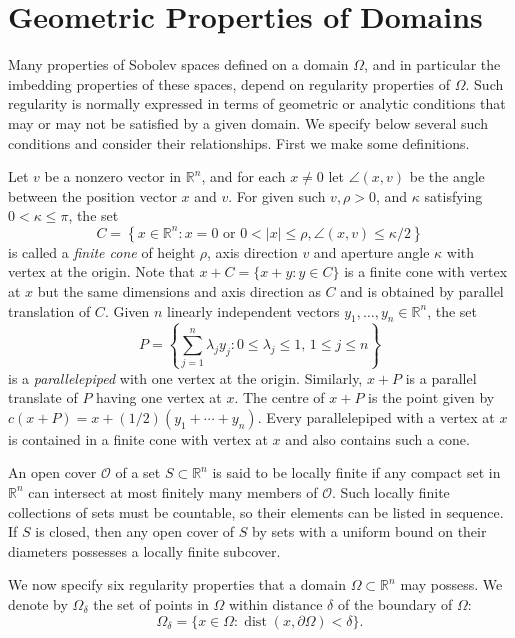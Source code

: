 \section{Geometric Properties of Domains}

\begin{para}
  Many properties of Sobolev spaces defined on a domain $\Omega$, and in particular the imbedding 
  properties of these spaces, depend on regularity properties of $\Omega$. Such regularity is 
  normally expressed in terms of geometric or analytic conditions that may or may not be satisfied 
  by a given domain. We specify below several such conditions and consider their relationships. 
  First we make some definitions.
  
  Let $v$ be a nonzero vector in $\mathbb{R}^n$, and for each $x \neq 0$ let $\angle(x, v)$ be the 
  angle between the position vector $x$ and $v$. For given such $v, \rho>0$, and $\kappa$ 
  satisfying $0<\kappa \leq \pi$, the set
  \[
    C = \left\{x \in \mathbb{R}^n: x=0 \text { or } 0<|x| \leq \rho, \angle(x, v) \leq \kappa / 2\right\}
  \]
  is called a \emph{finite cone} of height $\rho$, axis direction $v$ and aperture angle $\kappa$ 
  with vertex at the origin. Note that $x+C=\{x+y: y \in C\}$ is a finite cone with vertex at $x$ 
  but the same dimensions and axis direction as $C$ and is obtained by parallel translation of $C$.
  Given $n$ linearly independent vectors $y_1, \ldots, y_n \in \mathbb{R}^n$, the set
  \[
    P = \left\{\sum_{j=1}^n \lambda_j y_j: 0 \leq \lambda_j \leq 1,\, 1 \leq j \leq n\right\}
  \]
  is a \emph{parallelepiped} with one vertex at the origin.
  Similarly, $x+P$ is a parallel translate of $P$ having one vertex at $x$.
  The centre of $x+P$ is the point given by
  $c(x+P)=x+(1 / 2)\left(y_1+\cdots+y_n\right)$. Every parallelepiped with a vertex at $x$ is 
  contained in a finite cone with vertex at $x$ and also contains such a cone.
  
  An open cover $\mathscr{O}$ of a set $S \subset \mathbb{R}^n$ is said to be locally finite
  if any compact set in $\mathbb{R}^n$ can intersect at most finitely many members
  of $\mathscr{O}$. Such locally finite collections of sets must be countable, so their elements 
  can be listed in sequence. If $S$ is closed, then any open cover of $S$ by sets with a uniform 
  bound on their diameters possesses a locally finite subcover.
  
  We now specify six regularity properties that a domain $\Omega \subset \mathbb{R}^n$ may 
  possess. We denote by $\Omega_\delta$ the set of points in $\Omega$ within distance $\delta$ of 
  the boundary of $\Omega$:
  \[
    \Omega_\delta = \{x \in \Omega: \operatorname{dist}(x, \partial\Omega)<\delta\}.
  \]
\end{para}


